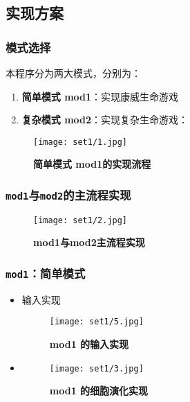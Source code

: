\documentclass[11pt]{article}
\begin{document}
    \hypertarget{ux5b9eux73b0ux65b9ux6848}{%
\subsection{实现方案}\label{ux5b9eux73b0ux65b9ux6848}}

\hypertarget{ux6a21ux5f0fux9009ux62e9}{%
\subsubsection{模式选择}\label{ux6a21ux5f0fux9009ux62e9}}
\hspace{2em} 本程序分为两大模式，分别为：
\begin{enumerate}
    \item \textbf{简单模式 mod1}：实现康威生命游戏
    \item \textbf{复杂模式 mod2}：实现复杂生命游戏：
\end{enumerate}
\begin{figure}[h]
    \centering
    \texttt{[image: set1/1.jpg]}
    \caption{\textbf{简单模式 mod1的实现流程}}
\end{figure}


\newpage
\subsubsection{\texorpdfstring{\texttt{mod1}与\texttt{mod2}的主流程实现}{mod1与mod2的主流程实现}}
\begin{figure}[H]
    \centering
    \texttt{[image: set1/2.jpg]}
    \caption{\textbf{mod1与mod2主流程实现}}
\end{figure}


\hypertarget{mod1ux7b80ux5355ux6a21ux5f0f}{%
\subsubsection{\texorpdfstring{\texttt{mod1}：简单模式}{mod1：简单模式}}\label{mod1ux7b80ux5355ux6a21ux5f0f}}
\begin{itemize}

\item
  输入实现
\begin{figure}[H]
    \centering
    \texttt{[image: set1/5.jpg]}
    \caption{\textbf{mod1 的输入实现}}
\end{figure}
\item 
  
\begin{figure}[H]
    \centering
    \texttt{[image: set1/3.jpg]}
    \caption{\textbf{mod1 的细胞演化实现}}
\end{figure}
  
\end{itemize}
\end{document}
